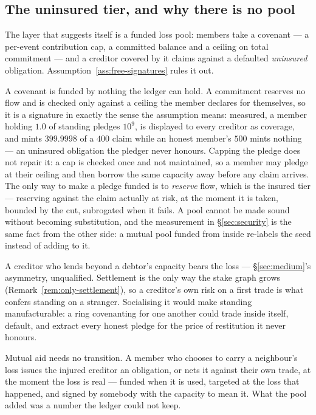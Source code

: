 \subsection{The uninsured tier, and why there is no pool}
\label{sec:no-pool}

The layer that suggests itself is a funded loss pool: members take a covenant --- a
per-event contribution cap, a committed balance and a ceiling on total commitment --- and a
creditor covered by it claims against a defaulted \emph{uninsured} obligation.
Assumption~\ref{ass:free-signatures} rules it out.

A covenant is funded by nothing the ledger can hold. A commitment reserves no flow and is
checked only against a ceiling the member declares for themselves, so it is a signature in
exactly the sense the assumption means: measured, a member holding $1.0$ of standing
pledges $10^9$, is displayed to every creditor as coverage, and mints $399.9998$ of a $400$
claim while an honest member's $500$ mints nothing --- an uninsured obligation the pledger
never honours. Capping the pledge does not repair it: a cap is checked once and not
maintained, so a member may pledge at their ceiling and then borrow the same capacity away
before any claim arrives. The only way to make a pledge funded is to \emph{reserve} flow,
which is the insured tier --- reserving against the claim actually at risk, at the moment
it is taken, bounded by the cut, subrogated when it fails. A pool cannot be made sound
without becoming substitution, and the measurement in \S\ref{sec:security} is the same
fact from the other side: a mutual pool funded from inside re-labels the seed instead of
adding to it.

\begin{remark}
\label{rem:uninsured-alone}
A creditor who lends beyond a debtor's capacity bears the loss --- \S\ref{sec:medium}'s
asymmetry, unqualified. Settlement is the only way the stake graph grows
(Remark~\ref{rem:only-settlement}), so a creditor's own risk on a first trade is what
confers standing on a stranger. Socialising it would make standing manufacturable: a
ring covenanting for one another could trade inside itself, default, and extract every
honest pledge for the price of restitution it never honours.
\end{remark}

Mutual aid needs no transition. A member who chooses to carry a neighbour's loss issues the
injured creditor an obligation, or nets it against their own trade, at the moment the loss
is real --- funded when it is used, targeted at the loss that happened, and signed by
somebody with the capacity to mean it. What the pool added was a number the ledger could
not keep.

